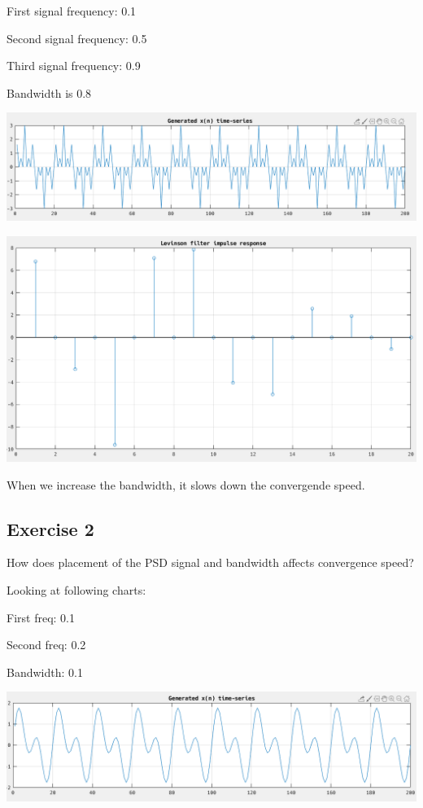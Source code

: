 \documentclass[12pt]{article}
\begin{document}
\vspace{1cm}

First signal frequency: 0.1

Second signal frequency: 0.5

Third signal frequency: 0.9

Bandwidth is 0.8

\includegraphics[width=\textwidth]{3.png}

\includegraphics[width=\textwidth]{4.png}

When we increase the bandwidth, it slows down the convergende speed.

\subsection{Exercise 2}

How does placement of the PSD signal and bandwidth affects convergence speed?

Looking at following charts:

First freq: 0.1

Second freq: 0.2

Bandwidth: 0.1

\includegraphics[width=\textwidth]{5.png}
\end{document}
